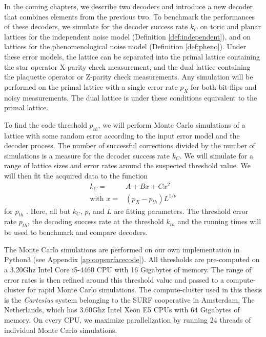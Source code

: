 In the coming chapters, we describe two decoders and introduce a new decoder that combines elements from the previous two. To benchmark the performances of these decoders, we simulate for the decoder success rate $k_C$ on toric and planar lattices for the independent noise model (Definition \ref{def:independent}), and on lattices for the phenomenological noise model (Definition \ref{def:pheno}). Under these error models, the lattice can be separated into the primal lattice containing the star operator X-parity check measurement, and the dual lattice containing the plaquette operator or Z-parity check measurements. Any simulation will be performed on the primal lattice with a single error rate $p_X$ for both bit-flips and noisy measurements. The dual lattice is under these conditions equivalent to the primal lattice. 

To find the code threshold $p_{th}$, we will perform Monte Carlo simulations of a lattice with some random error according to the input error model and the decoder process. The number of successful corrections divided by the number of simulations is a measure for the decoder success rate $k_C$. We will simulate for a range of lattice sizes and error rates around the suspected threshold value. We will then fit the acquired data to the function
\begin{align}\label{eq.4.fit}
  \nonumber k_{C} =& A + Bx + Cx^2 \\
  \text{with } x =& (p_X - p_{th})L^{1/\nu}
\end{align}
for $p_{th}$ \cite{wang2003confinement}. Here, all but $k_{C}$, $p$, and $L$ are fitting parameters. The threshold error rate $p_{th}$, the decoding success rate at the threshold $k_{th}$ and the running times will be used to benchmark and compare decoders. 

The Monte Carlo simulations are performed on our own implementation in Python3 (see Appendix \ref{ap:oopsurfacecode}). All thresholds are pre-computed on a 3.20Ghz Intel Core i5-4460 CPU with 16 Gigabytes of memory. The range of error rates is then refined around this threshold value and passed to a compute-cluster for rapid Monte Carlo simulations. The compute-cluster used in this thesis is the \emph{Cartesius} system belonging to the SURF cooperative in Amsterdam, The Netherlands, which has 3.60Ghz Intel Xeon E5 CPUs with 64 Gigabytes of memory. On every CPU, we maximize parallelization by running 24 threads of individual Monte Carlo simulations. 

